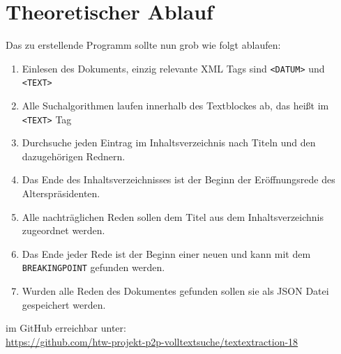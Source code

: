 \section{Theoretischer Ablauf}
Das zu erstellende Programm sollte nun grob wie folgt ablaufen:
\begin{enumerate}
	\item Einlesen des Dokuments, einzig relevante XML Tags sind \lstinline|<DATUM>| und \lstinline|<TEXT>|
	\item Alle Suchalgorithmen laufen innerhalb des Textblockes ab, das heißt im \lstinline|<TEXT>| Tag
	\item Durchsuche jeden Eintrag im Inhaltsverzeichnis nach Titeln und den dazugehörigen Rednern.
	\item Das Ende des Inhaltsverzeichnisses ist der Beginn der Eröffnungsrede des Alterspräsidenten.
	\item Alle nachträglichen Reden sollen dem Titel aus dem Inhaltsverzeichnis zugeordnet werden.
	\item Das Ende jeder Rede ist der Beginn einer neuen und kann mit dem \lstinline|BREAKINGPOINT| gefunden werden.
	\item Wurden alle Reden des Dokumentes gefunden sollen sie als JSON Datei gespeichert werden.
\end{enumerate}

\noindent im GitHub erreichbar unter:\\ \url{https://github.com/htw-projekt-p2p-volltextsuche/textextraction-18}